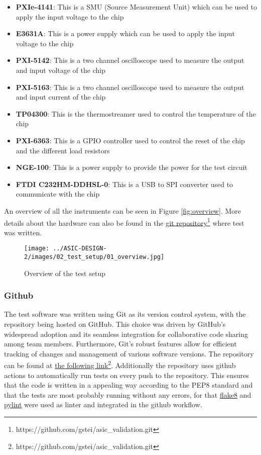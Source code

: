 \begin{itemize}
    \item \textbf{PXIe-4141}: This is a SMU (Source Measurement Unit) which can be used to apply the input voltage to the chip
    \item \textbf{E3631A}: This is a power supply which can be used to apply the input voltage to the chip
    \item \textbf{PXI-5142}: This is a two channel oscilloscope used to measure the output and input voltage of the chip
    \item \textbf{PXI-5163}: This is a two channel oscilloscope used to measure the output and input current of the chip
    \item \textbf{TP04300}: This is the thermostreamer used to control the temperature of the chip
    \item \textbf{PXI-6363}: This is a GPIO controller used to control the reset of the chip and the different load resistors
    \item \textbf{NGE-100}: This is a power supply to provide the power for the test circuit
    \item \textbf{FTDI C232HM-DDHSL-0}: This is a USB to SPI converter used to communicate with the chip
\end{itemize}

An overview of all the instruments can be seen in Figure \autoref{fig:overview}. More details about the hardware can also be found in the \href{https://github.com/gstei/asic_validation/}{git repository}\footnote{https://github.com/gstei/asic\_validation.git} where test was written.

\begin{figure}[h]
    \centering
    \texttt{[image: ../ASIC-DESIGN-2/images/02\_test\_setup/01\_overview.jpg]}
    \caption{Overview of the test setup}
    \label{fig:overview}
\end{figure}

\subsubsection{Github}
The test software was written using Git as its version control system, with the repository being hosted on GitHub. This choice was driven by GitHub's widespread adoption and its seamless integration for collaborative code sharing among team members. Furthermore, Git's robust features allow for efficient tracking of changes and management of various software versions. The repository can be found at \href{https://github.com/gstei/asic_validation.git}{the following link}\footnote{https://github.com/gstei/asic\_validation.git}. Additionally the repository uses github actions to automatically run tests on every push to the repository. This ensures that the code is written in a appealing way according to the PEP8 standard and that the tests are most probably running without any errors, for that \href{par:Flake8}{flake8} and \href{par:Pylint}{pylint} were used as linter and integrated in the github workflow.


